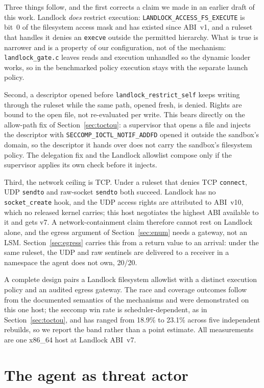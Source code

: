 \documentclass[11pt]{article}
\newcommand{\RaceLo}{18.9}
\newcommand{\RaceHi}{23.1}
\begin{document}
Three things follow, and the first corrects a claim we made in an earlier draft of this work.
Landlock \emph{does} restrict execution: \texttt{LANDLOCK\_ACCESS\_FS\_EXECUTE} is bit~0 of the
filesystem access mask and has existed since ABI~v1, and a ruleset that handles it denies an
\texttt{execve} outside the permitted hierarchy. What is true is narrower and is a property of our
configuration, not of the mechanism: \texttt{landlock\_gate.c} leaves reads and execution unhandled so
the dynamic loader works, so in the benchmarked policy execution stays with the separate launch policy.

Second, a descriptor opened before \texttt{landlock\_restrict\_self} keeps writing through the ruleset
while the same path, opened fresh, is denied. Rights are bound to the open file, not re-evaluated per
write. This bears directly on the allow-path fix of Section~\ref{sec:toctou}: a supervisor that opens
a file and injects the descriptor with \texttt{SECCOMP\_IOCTL\_NOTIF\_ADDFD} opened it outside the
sandbox's domain, so the descriptor it hands over does not carry the sandbox's filesystem policy. The
delegation fix and the Landlock allowlist compose only if the supervisor applies its own check before
it injects.

Third, the network ceiling is TCP. Under a ruleset that denies TCP \texttt{connect}, UDP
\texttt{sendto} and raw-socket \texttt{sendto} both succeed. Landlock has no \texttt{socket\_create}
hook, and the UDP access rights are attributed to ABI~v10, which no released kernel carries; this host
negotiates the highest ABI available to it and gets v7. A network-containment claim therefore cannot
rest on Landlock alone, and the egress argument of Section~\ref{sec:enum} needs a gateway, not an LSM.
Section~\ref{sec:egress} carries this from a return value to an arrival: under the same ruleset, the UDP
and raw sentinels are delivered to a receiver in a namespace the agent does not own, 20/20.

A complete design pairs a Landlock filesystem allowlist with a distinct execution policy
and an audited egress gateway. The race and coverage outcomes follow from the documented semantics of
the mechanisms and were demonstrated on this one host; the seccomp win rate is scheduler-dependent, as in Section~\ref{sec:toctou},
and has ranged from \RaceLo\% to \RaceHi\% across five independent rebuilds, so we report the band
rather than a point estimate.
All measurements are one x86\_64 host at Landlock ABI~v7.

\part{The agent as threat actor}
\end{document}
